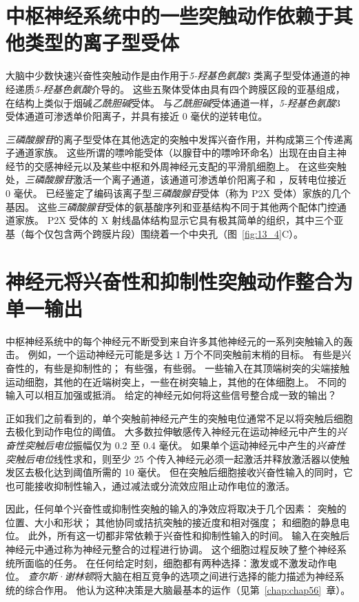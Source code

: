 \section{中枢神经系统中的一些突触动作依赖于其他类型的离子型受体}

大脑中少数快速兴奋性突触动作是由作用于\textit{5-羟基色氨酸}3 类离子型受体通道的神经递质\textit{5-羟基色氨酸}介导的。
这些五聚体受体由具有四个跨膜区段的亚基组成，在结构上类似于烟碱\textit{乙酰胆碱}受体。
与\textit{乙酰胆碱}受体通道一样，\textit{5-羟基色氨酸}3 受体通道可渗透单价阳离子，并具有接近 0 毫伏的逆转电位。


\textit{三磷酸腺苷}的离子型受体在其他选定的突触中发挥兴奋作用，并构成第三个传递离子通道家族。
这些所谓的嘌呤能受体（以腺苷中的嘌呤环命名）出现在由自主神经节的交感神经元以及某些中枢和外周神经元支配的平滑肌细胞上。
在这些突触处，\textit{三磷酸腺苷}激活一个离子通道，该通道可渗透单价阳离子和 ，反转电位接近 0 毫伏。
已经鉴定了编码该离子型\textit{三磷酸腺苷}受体（称为 P2X 受体）家族的几个基因。
这些\textit{三磷酸腺苷}受体的氨基酸序列和亚基结构不同于其他两个配体门控通道家族。
P2X 受体的 X 射线晶体结构显示它具有极其简单的组织，其中三个亚基（每个仅包含两个跨膜片段）围绕着一个中央孔（图~\ref{fig:13_4}C）。



\section{神经元将兴奋性和抑制性突触动作整合为单一输出}

中枢神经系统中的每个神经元不断受到来自许多其他神经元的一系列突触输入的轰击。
例如，一个运动神经元可能是多达 1 万个不同突触前末梢的目标。
有些是兴奋性的，有些是抑制性的；
有些强，有些弱。
一些输入在其顶端树突的尖端接触运动细胞，其他的在近端树突上，一些在树突轴上，其他的在体细胞上。
不同的输入可以相互加强或抵消。
给定的神经元如何将这些信号整合成一致的输出？


正如我们之前看到的，单个突触前神经元产生的突触电位通常不足以将突触后细胞去极化到动作电位的阈值。
大多数拉伸敏感传入神经元在运动神经元中产生的\textit{兴奋性突触后电位}振幅仅为 0.2 至 0.4 毫伏。
如果单个运动神经元中产生的\textit{兴奋性突触后电位}线性求和，则至少 25 个传入神经元必须一起激活并释放激活器以使触发区去极化达到阈值所需的 10 毫伏。
但在突触后细胞接收兴奋性输入的同时，它也可能接收抑制性输入，通过减法或分流效应阻止动作电位的激活。


因此，任何单个兴奋性或抑制性突触的输入的净效应将取决于几个因素：
突触的位置、大小和形状；
其他协同或拮抗突触的接近度和相对强度；
和细胞的静息电位。 
此外，所有这一切都非常依赖于兴奋性和抑制性输入的时间。
输入在突触后神经元中通过称为神经元整合的过程进行协调。
这个细胞过程反映了整个神经系统所面临的任务。
在任何给定时刻，细胞都有两种选择：激发或不激发动作电位。
\textit{查尔斯·谢林顿}将大脑在相互竞争的选项之间进行选择的能力描述为神经系统的综合作用。
他认为这种决策是大脑最基本的运作（见第~\ref{chap:chap56}~章）。



